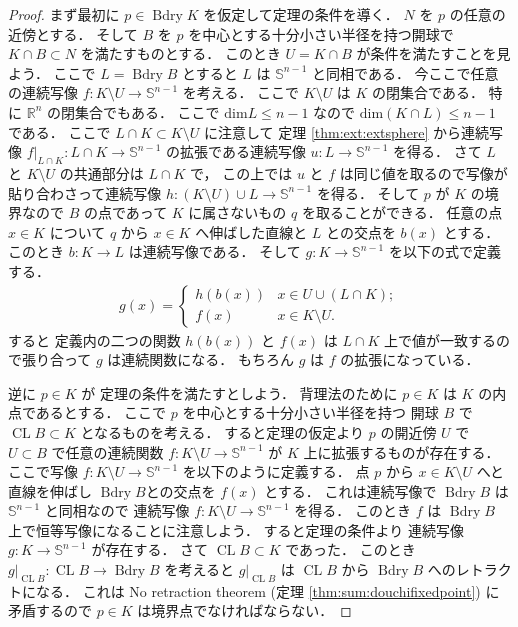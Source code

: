 \documentclass[leqno, a4paper, 12pt]{jsarticle}
\theoremstyle{plain}
\theoremstyle{definition}
\theoremstyle{remark}
\newcommand{\rr}{\mathbb{R}}
\DeclareMathOperator{\bd}{\mathrm{Bdry}}
\DeclareMathOperator{\cl}{\mathrm{CL}}
\newcommand{\yodim}{\mathrm{dim}}
\newcommand{\yospfont}[1]{\mathbb{#1}}
\newcommand{\yosphere}[1]{\yospfont{S}^{#1}}
\numberwithin{equation}{section}
\begin{document}
\begin{proof}
まず最初に
$p\in \bd K$
を仮定して定理の条件を導く．
$N$
を
$p$
の任意の近傍とする．
そして
$B$
を
$p$
を中心とする十分小さい半径を持つ開球で
$K\cap B\subset N$
を満たすものとする．
このとき
$U=K\cap B$
が条件を満たすことを見よう．
ここで
$L=\bd B$
とすると
$L$
は
$\yosphere{n-1}$
と同相である．
今ここで任意の連続写像
$f\colon K\setminus U\to \yosphere{n-1}$
を考える．
ここで
$K\setminus U$
は
$K$
の閉集合である．
特に
$\rr^{n}$
の閉集合でもある．
ここで
$\yodim L\le n-1$
なので
$\yodim(K\cap L)\le n-1$
である．
ここで
$L\cap K\subset K\setminus U$
に注意して
定理
\ref{thm:ext:extsphere}
から連続写像
$f|_{L\cap K}\colon L\cap K\to \yosphere{n-1}$
の拡張である連続写像
$u\colon L\to \yosphere{n-1}$
を得る．
さて
$L$
と
$K\setminus U$
の共通部分は
$L\cap K$
で，
この上では
$u$
と
$f$
は同じ値を取るので写像が貼り合わさって連続写像
$h\colon (K\setminus U)\cup L\to \yosphere{n-1}$
を得る．
そして
$p$
が
$K$
の境界なので
$B$
の点であって
$K$
に属さないもの
$q$
を取ることができる．
任意の点
$x\in K$
について
$q$
から
$x\in K$
へ伸ばした直線と
$L$
との交点を
$b(x)$
とする．
このとき
$b\colon K\to L$
は連続写像である．
そして
$g\colon K\to \yosphere{n-1}$
を以下の式で定義する．
\begin{align*}
g(x)
=
\begin{cases}
h(b(x)) & \text{$x\in U\cup (L\cap K)$};\\
f(x) & \text{$x\in K\setminus U$}. 
\end{cases}
\end{align*}
すると
定義内の二つの関数
$h(b(x))$
と
$f(x)$
は
$L\cap K$
上で値が一致するので張り合って
$g$
は連続関数になる．
もちろん
$g$
は
$f$
の拡張になっている．

逆に
$p\in K$
が
定理の条件を満たすとしよう．
背理法のために
$p\in K$
は
$K$
の内点であるとする．
ここで
$p$
を中心とする十分小さい半径を持つ
開球
$B$
で
$\cl B\subset K$
となるものを考える．
すると定理の仮定より
$p$
の開近傍
$U$
で
$U\subset B$
で任意の連続関数
$f\colon K\setminus U\to \yosphere{n-1}$
が
$K$
上に拡張するものが存在する．
ここで写像
$f\colon K\setminus U\to \yosphere{n-1}$
を以下のように定義する．
点
$p$
から
$x\in K\setminus U$
へと直線を伸ばし
$\bd B$との交点を
$f(x)$
とする．
これは連続写像で
$\bd B$
は
$\yosphere{n-1}$
と同相なので
連続写像
$f\colon K\setminus U\to \yosphere{n-1}$
を得る．
このとき
$f$
は
$\bd B$
上で恒等写像になることに注意しよう．
すると定理の条件より
連続写像
$g\colon K\to \yosphere{n-1}$
が存在する．
さて
$\cl B\subset K$
であった．
このとき
$g|_{\cl B}\colon \cl B\to \bd B$
を考えると
$g|_{\cl B}$
は
$\cl B$
から
$\bd B$
へのレトラクトになる．
これは
No retraction theorem 
(定理
\ref{thm:sum:douchifixedpoint})
に矛盾するので
$p\in K$
は境界点でなければならない．
\end{proof}
\end{document}
